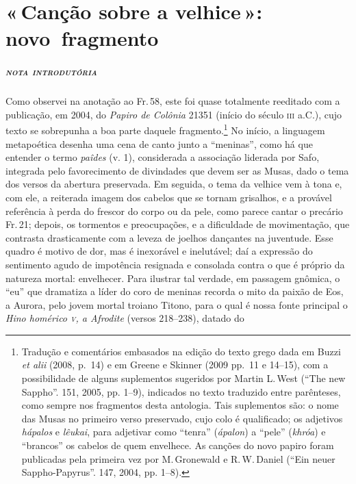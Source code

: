 \chapter{«\,Canção sobre a velhice\,»: novo~fragmento}

\paragraph{\textsc{nota introdutória}}
Como observei na anotação ao Fr.\,58, este foi quase totalmente reeditado com a 
publicação, em 2004, do \textit{Papiro de Colônia} 21351 (início do século \textsc{iii} a.C.), 
cujo texto se sobrepunha a boa parte daquele fragmento.\footnote{Tradução e comentários embasados na edição do texto grego dada em Buzzi \textit{et alii} (2008, p.~14) e em Greene e Skinner (2009 pp.~11 e 14--15), com a possibilidade de alguns suplementos sugeridos por Martin L.\,West (``The new Sappho''. \textit{} 151, 2005, pp. 1--9), indicados no texto traduzido entre parênteses, como sempre nos fragmentos desta antologia. Tais suplementos são: o nome das Musas no primeiro verso preservado, cujo colo é qualificado; os adjetivos \textit{hápalos} e \textit{lêukai}, para adjetivar como ``tenra'' (\textit{ápalon}) a ``pele'' (\textit{khróa}) e ``brancos'' os cabelos de quem envelhece. As canções do novo papiro foram publicadas pela primeira vez por M.\,Gronewald e R.\,W.\,Daniel (``Ein neuer Sappho-Papyrus''. \textit{} 147, 2004, pp. 1--8).} No início, a 
linguagem metapoética desenha uma cena de canto junto a ``meninas'', como há que entender o termo \textit{paîdes} (v. 1), considerada a associação liderada por Safo, 
integrada pelo favorecimento de divindades que devem ser as Musas,
dado o tema dos versos da abertura preservada. Em seguida, o tema da velhice
vem à tona e, com ele, a reiterada imagem dos cabelos que se tornam grisalhos,
e a provável referência à perda do frescor do corpo ou da pele, como parece cantar o precário Fr.\,21; depois, os
tormentos e preocupações, e a dificuldade de movimentação, que contrasta
drasticamente com a leveza de joelhos dançantes na juventude. Esse quadro é
motivo de dor, mas é inexorável e inelutável; daí a expressão do sentimento
agudo de impotência resignada e consolada contra o que é próprio da natureza mortal: envelhecer. Para
ilustrar tal verdade, em passagem gnômica, o “eu” que dramatiza a líder do coro de meninas recorda o
mito da paixão de Eos, a Aurora, pelo jovem mortal troiano Titono, para o qual é nossa fonte
principal o \textit{Hino homérico \textsc{v}, a Afrodite }(versos 218--238), datado do
